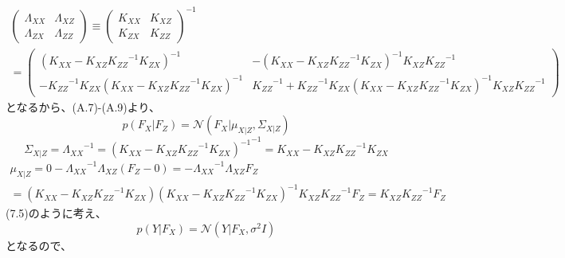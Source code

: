 \documentclass{jsarticle}
\begin{document}
\begin{equation}
\begin{split}
\begin{pmatrix}
\Lambda_{XX} & \Lambda_{XZ}\\
\Lambda_{ZX} & \Lambda_{ZZ} 
\end{pmatrix}
\equiv \begin{pmatrix}
K_{XX} & K_{XZ}\\
K_{ZX} & K_{ZZ} 
\end{pmatrix}^{-1}\\
=\begin{pmatrix}
(K_{XX} - K_{XZ}{K_{ZZ}}^{-1}K_{ZX})^{-1} & -(K_{XX} - K_{XZ}{K_{ZZ}}^{-1}K_{ZX})^{-1}K_{XZ}{K_{ZZ}}^{-1}\\
-{K_{ZZ}}^{-1}K_{ZX}(K_{XX} - K_{XZ}{K_{ZZ}}^{-1}K_{ZX})^{-1} & {K_{ZZ}}^{-1} + {K_{ZZ}}^{-1}K_{ZX}(K_{XX} - K_{XZ}{K_{ZZ}}^{-1}K_{ZX})^{-1} K_{XZ}{K_{ZZ}}^{-1}
\end{pmatrix}
\end{split}
\end{equation}
となるから、(A.7)-(A.9)より、
\begin{equation}
p(F_X | F_Z) = \mathcal{N}(F_X | \mu_{X | Z}, \Sigma_{X | Z})
\end{equation}
\begin{equation}
\Sigma_{X | Z} = {\Lambda_{XX}}^{-1} = {(K_{XX} - K_{XZ}{K_{ZZ}}^{-1}K_{ZX})^{-1}}^{-1}
=K_{XX} - K_{XZ}{K_{ZZ}}^{-1}K_{ZX}
\end{equation}
\begin{equation}
\begin{split}
\mu_{X | Z} = 0 - {\Lambda_{XX}}^{-1} \Lambda_{XZ}(F_Z - 0)
= - {\Lambda_{XX}}^{-1} \Lambda_{XZ}F_Z\\
= (K_{XX} - K_{XZ}{K_{ZZ}}^{-1}K_{ZX}) (K_{XX} - K_{XZ}{K_{ZZ}}^{-1}K_{ZX})^{-1}K_{XZ}{K_{ZZ}}^{-1} F_Z
= K_{XZ}{K_{ZZ}}^{-1} F_Z
\end{split}
\end{equation}
(7.5)のように考え、
\begin{equation}
p(Y | F_X) = \mathcal{N}(Y | F_X, \sigma^{2}I)
\end{equation}
となるので、
\end{document}
